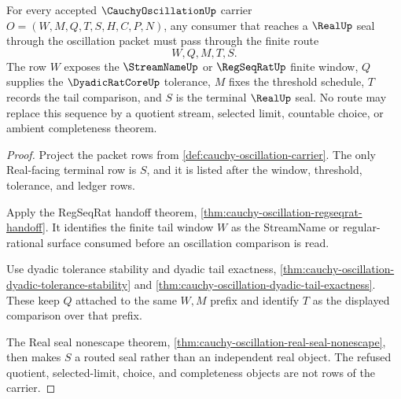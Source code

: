 \begin{theorem}
\label{thm:cauchy-oscillation-regseqrat-real-seal-route}
For every accepted $\CauchyOscillationUp$ carrier $O=(W,M,Q,T,S,H,C,P,N)$, any consumer that reaches a $\RealUp$ seal through the oscillation packet must pass through the finite route
$$
W,Q,M,T,S .
$$
The row $W$ exposes the $\StreamNameUp$ or $\RegSeqRatUp$ finite window, $Q$ supplies the $\DyadicRatCoreUp$ tolerance, $M$ fixes the threshold schedule, $T$ records the tail comparison, and $S$ is the terminal $\RealUp$ seal. No route may replace this sequence by a quotient stream, selected limit, countable choice, or ambient completeness theorem.
\end{theorem}
\begin{proof}
Project the packet rows from \autoref{def:cauchy-oscillation-carrier}. The only Real-facing terminal row is $S$, and it is listed after the window, threshold, tolerance, and ledger rows.

Apply the RegSeqRat handoff theorem, \autoref{thm:cauchy-oscillation-regseqrat-handoff}. It identifies the finite tail window $W$ as the StreamName or regular-rational surface consumed before an oscillation comparison is read.

Use dyadic tolerance stability and dyadic tail exactness, \autoref{thm:cauchy-oscillation-dyadic-tolerance-stability} and \autoref{thm:cauchy-oscillation-dyadic-tail-exactness}. These keep $Q$ attached to the same $W,M$ prefix and identify $T$ as the displayed comparison over that prefix.

The Real seal nonescape theorem, \autoref{thm:cauchy-oscillation-real-seal-nonescape}, then makes $S$ a routed seal rather than an independent real object. The refused quotient, selected-limit, choice, and completeness objects are not rows of the carrier.
\end{proof}

